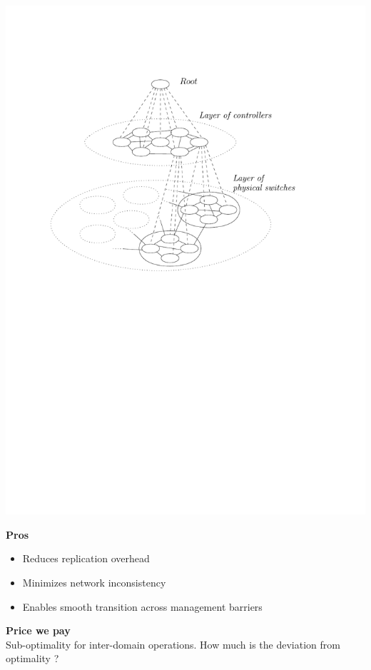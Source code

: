 \documentclass[portrait,a1paper,fontscale=0.5]{baposter} %
\begin{document}
\begin{poster}
{\begin{center}
\includegraphics[scale=0.7]{hierarchy}
\label{fig:hierarchy}
\end{center}

\textbf{Pros}
\begin{itemize}
    \item Reduces replication overhead
    \item Minimizes network inconsistency
    \item Enables smooth transition across management barriers
\end{itemize}
\textbf{Price we pay}  \\
Sub-optimality for inter-domain operations. How much is the deviation from optimality ?

}


\end{poster}
\end{document}
